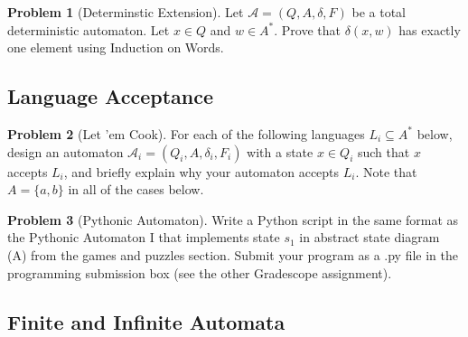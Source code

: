 \documentclass[11pt]{article}
\theoremstyle{theorem} %
\theoremstyle{definition} %
\newtheorem{problem}                    {{\color{BurntOrange}Problem}}
\theoremstyle{remark} %
\begin{document}
\begin{problem}
    [Determinstic Extension]
    Let \(\mathcal A = (Q, A, \delta, F)\) be a total deterministic automaton.
    Let \(x \in Q\) and \(w \in A^*\).
    Prove that \(\delta(x, w)\) has exactly one element using Induction on Words.
\end{problem}

\subsection*{Language Acceptance}

\begin{problem}
    [Let 'em Cook]
    For each of the following languages \(L_i \subseteq A^*\) below, design an automaton \(\mathcal A_i = (Q_i, A, \delta_i, F_i)\) with a state \(x \in Q_i\) such that \(x\) accepts \(L_i\), and briefly explain why your automaton accepts \(L_i\).
    Note that \(A = \{a, b\}\) in all of the cases below.
\end{problem}

\begin{problem}
    [Pythonic Automaton]
    Write a Python script in the same format as the Pythonic Automaton I that implements state \(s_1\) in abstract state diagram (A) from the games and puzzles section. 
    Submit your program as a .py file in the programming submission box (see the other Gradescope assignment).
\end{problem}

\subsection*{Finite and Infinite Automata}
\end{document}
